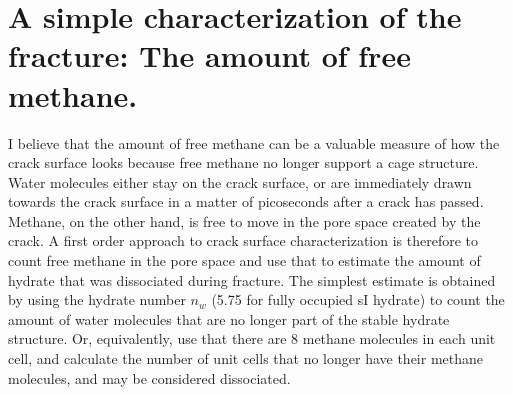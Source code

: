 \section{A simple characterization of the fracture: The amount of free methane.}
I believe that the amount of free methane can be a valuable measure of how the crack surface looks because free methane no longer support a cage structure. Water molecules either stay on the crack surface, or are immediately drawn towards the crack surface in a matter of picoseconds after a crack has passed. Methane, on the other hand, is free to move in the pore space created by the crack. A first order approach to crack surface characterization is therefore to count free methane in the pore space and use that to estimate the amount of hydrate that was dissociated during fracture. The simplest estimate is obtained by using the hydrate number $n_w$ (5.75 for fully occupied sI hydrate) to count the amount of water molecules that are no longer part of the stable hydrate structure. Or, equivalently, use that there are 8 methane molecules in each unit cell, and calculate the number of unit cells that no longer have their methane molecules, and may be considered dissociated.


